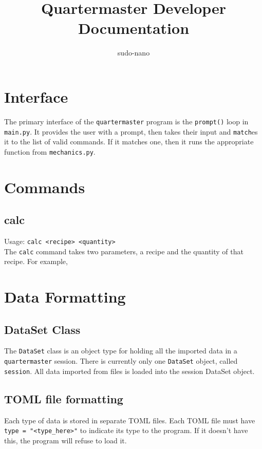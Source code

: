 \documentclass{article}
\title{Quartermaster Developer Documentation}
\author{sudo-nano}
\begin{document}
\maketitle

\tableofcontents

\section{Interface}
The primary interface of the \verb|quartermaster| program is the \verb|prompt()| loop in \verb|main.py|. It provides the user with a prompt, then takes their input and \verb|match|es it to the list of valid commands. If it matches one, then it runs the appropriate function from \verb|mechanics.py|. 


\section{Commands}

\subsection{calc}
Usage: \verb|calc <recipe> <quantity>| \\

The \verb|calc| command takes two parameters, a recipe and the quantity of that recipe. For example, 

\section{Data Formatting}

\subsection{DataSet Class}
The \verb|DataSet| class is an object type for holding all the imported data in a \verb|quartermaster| session. There is currently only one \verb|DataSet| object, called \verb|session|. 
All data imported from files is loaded into the session DataSet object. 

\subsection{TOML file formatting}
Each type of data is stored in separate TOML files. Each TOML file must have \verb|type = "<type_here>"| to indicate its type to the program. If it doesn't have this, the program will refuse to load it. \\
\end{document}
